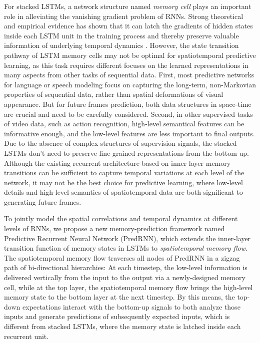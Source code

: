 \documentclass[10pt,journal,compsoc]{IEEEtran}
\begin{document}
For stacked LSTMs, a network structure named \textit{memory cell} plays an important role in alleviating the vanishing gradient problem of RNNs. Strong theoretical and empirical evidence has shown that it can latch the gradients of hidden states inside each LSTM unit in the training process and thereby preserve valuable information of underlying temporal dynamics \cite{hochreiter1997long}.
However, the state transition pathway of LSTM memory cells may not be optimal for spatiotemporal predictive learning, as this task requires different focuses on the learned representations in many aspects from other tasks of sequential data.
First, most predictive networks for language or speech modeling \cite{Sutskever2011Generating,Cho2014On,Graves2014Towards} focus on capturing the long-term, non-Markovian properties of sequential data, rather than spatial deformations of visual appearance. But for future frames prediction, both data structures in space-time are crucial and need to be carefully considered.
Second, in other supervised tasks of video data, such as action recognition, high-level semantical features can be informative enough, and the low-level features are less important to final outputs. Due to the absence of complex structures of supervision signals, the stacked LSTMs don't need to preserve fine-grained representations from the bottom up. 
Although the existing recurrent architecture based on inner-layer memory transitions can be sufficient to capture temporal variations at each level of the network, it may not be the best choice for predictive learning, where low-level details and high-level semantics of spatiotemporal data are both significant to generating future frames. 



To jointly model the spatial correlations and temporal dynamics at different levels of RNNs, we propose a new memory-prediction framework named Predictive Recurrent Neural Network (PredRNN), which extends the inner-layer transition function of memory states in LSTMs to \textit{spatiotemporal memory flow}.
The spatiotemporal memory flow traverses all nodes of PredRNN in a zigzag path of bi-directional hierarchies:
At each timestep, the low-level information is delivered vertically from the input to the output via a newly-designed memory cell, while at the top layer, the spatiotemporal memory flow brings the high-level memory state to the bottom layer at the next timestep.
By this means, the top-down expectations interact with the bottom-up signals to both analyze those inputs and generate predictions of subsequently expected inputs, which is different from stacked LSTMs, where the memory state is latched inside each recurrent unit.
\end{document}

